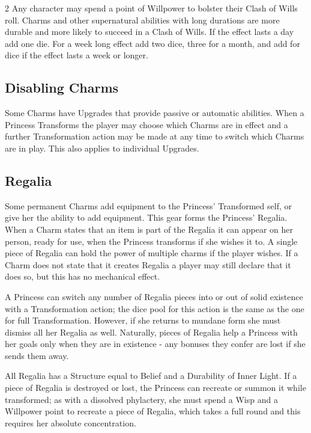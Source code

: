 \begin{multicols}{2}
Any character may spend a point of Willpower to bolster their Clash of Wills roll. Charms and other supernatural abilities with long durations are more durable and more likely to succeed in a Clash of Wills. If the effect lasts a day add one die. For a week long effect add two dice, three for a month, and add for dice if the effect lasts a week or longer. 

\subsection*{Disabling Charms}

Some Charms have Upgrades that provide passive or automatic abilities. When a Princess Transforms the player may choose which Charms are in effect and a further Transformation action may be made at any time to switch which Charms are in play. This also applies to individual Upgrades. 

\subsection*{Regalia}

Some permanent Charms add equipment to the Princess' Transformed self, or give her the ability to add equipment. This gear forms the Princess' Regalia. When a Charm states that an item is part of the Regalia it can appear on her person, ready for use, when the Princess transforms if she wishes it to. A single piece of Regalia can hold the power of multiple charms if the player wishes. If a Charm does not state that it creates Regalia a player may still declare that it does so, but this has no mechanical effect. 

A Princess can switch any number of Regalia pieces into or out of solid existence with a Transformation action; the dice pool for this action is the same as the one for full Transformation. However, if she returns to mundane form she must dismiss all her Regalia as well. Naturally, pieces of Regalia help a Princess with her goals only when they are in existence - any bonuses they confer are lost if she sends them away.

All Regalia has a Structure equal to Belief and a Durability of Inner Light. If a piece of Regalia is destroyed or lost, the Princess can recreate or summon it while transformed; as with a dissolved phylactery, she must spend a Wisp and a Willpower point to recreate a piece of Regalia, which takes a full round and this requires her absolute concentration. 


\end{multicols}
